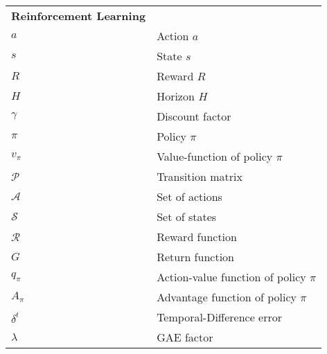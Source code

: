 \begin{longtable}{ll}
{\bf Reinforcement Learning} \\

$a$ & Action $a$ \\
$s$ & State $s$ \\
$R$ & Reward $R$ \\
$H$ & Horizon $H$ \\
$\gamma$ & Discount factor \\
$\pi$ & Policy $\pi$\\
$v_{\pi}$ & Value-function of policy $\pi$ \\
$\mathcal{P}$ & Transition matrix\\
$\mathcal{A}$ & Set of actions \\
$\mathcal{S}$ & Set of states \\
$\mathcal{R}$ & Reward function \\
$G$ & Return function \\
$q_{\pi}$ & Action-value function of policy $\pi$ \\
$A_{\pi}$ & Advantage function of policy $\pi$\\
$\delta^{t}$ & Temporal-Difference error \\
$\lambda$ & GAE factor \\





















\end{longtable}

